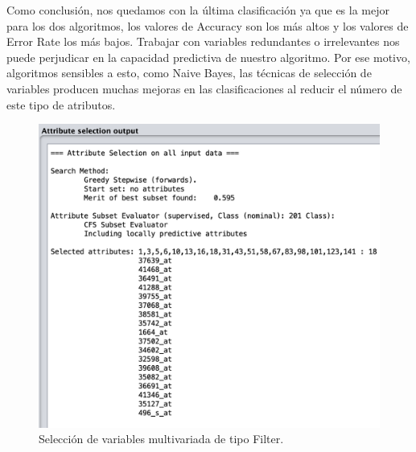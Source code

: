 \documentclass{article}
\begin{document}
	Como conclusión, nos quedamos con la última clasificación ya que es la mejor para los dos algoritmos, los valores de Accuracy son los más altos y los valores de Error Rate los más bajos. Trabajar con variables redundantes o irrelevantes nos puede perjudicar en la capacidad predictiva de nuestro algoritmo. Por ese motivo, algoritmos sensibles a esto, como Naive Bayes, las técnicas de selección de variables producen muchas mejoras en las clasificaciones al reducir el número de este tipo de atributos.
	
	\begin{figure}[h]
		\centering
		\includegraphics[scale=0.5]{filter.png}
		\caption{Selección de variables multivariada de tipo Filter.}
		\label{fig:filter}
	\end{figure}
	
\end{document}

